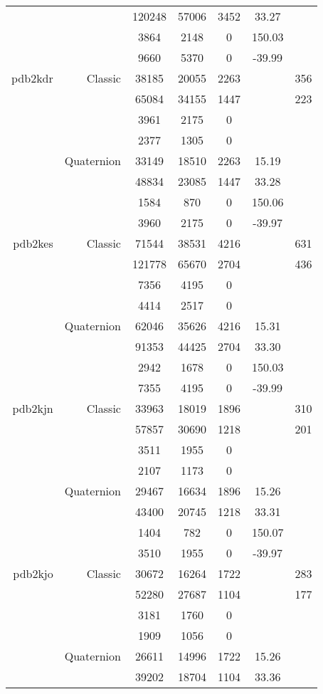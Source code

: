 \begin{xltabular}{\textwidth}{r|rcccSc}
& & 120248 & 57006 & 3452 & 33.27 & \\
& & 3864 & 2148 & 0 & 150.03 & \\
& & 9660 & 5370 & 0 & -39.99 & \\ \addlinespace
pdb2kdr & Classic & 38185 & 20055 & 2263 & & 356 \\
& & 65084 & 34155 & 1447 & & 223 \\
& & 3961 & 2175 & 0 & & \\
& & 2377 & 1305 & 0 & & \\
& Quaternion & 33149 & 18510 & 2263 & 15.19 & \\
& & 48834 & 23085 & 1447 & 33.28 & \\
& & 1584 & 870 & 0 & 150.06 & \\
& & 3960 & 2175 & 0 & -39.97 & \\ \addlinespace
pdb2kes & Classic & 71544 & 38531 & 4216 & & 631 \\
& & 121778 & 65670 & 2704 & & 436 \\
& & 7356 & 4195 & 0 & & \\
& & 4414 & 2517 & 0 & & \\
& Quaternion & 62046 & 35626 & 4216 & 15.31 & \\
& & 91353 & 44425 & 2704 & 33.30 & \\
& & 2942 & 1678 & 0 & 150.03 & \\
& & 7355 & 4195 & 0 & -39.99 & \\ \addlinespace
pdb2kjn & Classic & 33963 & 18019 & 1896 & & 310 \\
& & 57857 & 30690 & 1218 & & 201 \\
& & 3511 & 1955 & 0 & & \\
& & 2107 & 1173 & 0 & & \\
& Quaternion & 29467 & 16634 & 1896 & 15.26 & \\
& & 43400 & 20745 & 1218 & 33.31 & \\
& & 1404 & 782 & 0 & 150.07 & \\
& & 3510 & 1955 & 0 & -39.97 & \\ \addlinespace
pdb2kjo & Classic & 30672 & 16264 & 1722 & & 283 \\
& & 52280 & 27687 & 1104 & & 177 \\
& & 3181 & 1760 & 0 & & \\
& & 1909 & 1056 & 0 & & \\
& Quaternion & 26611 & 14996 & 1722 & 15.26 & \\
& & 39202 & 18704 & 1104 & 33.36 & \\

\end{xltabular}
